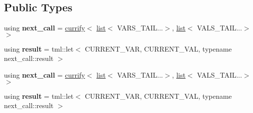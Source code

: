 \subsection*{Public Types}
\begin{DoxyCompactItemize}
\item 
\hypertarget{structtml_1_1impl_1_1multi__let__currifier_1_1currify_3_01list_3_01CURRENT__VAR_00_01VARS__TAIL_0ea6fde6f25a35f6c4f514840e32dfa6_a5dacf4be2ea2cea7e88ece32e5e13adc}{using {\bfseries next\+\_\+call} = \hyperlink{structtml_1_1impl_1_1multi__let__currifier_1_1currify}{currify}$<$ \hyperlink{structtml_1_1list}{list}$<$ V\+A\+R\+S\+\_\+\+T\+A\+I\+L...$>$, \hyperlink{structtml_1_1list}{list}$<$ V\+A\+L\+S\+\_\+\+T\+A\+I\+L...$>$$>$}\label{structtml_1_1impl_1_1multi__let__currifier_1_1currify_3_01list_3_01CURRENT__VAR_00_01VARS__TAIL_0ea6fde6f25a35f6c4f514840e32dfa6_a5dacf4be2ea2cea7e88ece32e5e13adc}

\item 
\hypertarget{structtml_1_1impl_1_1multi__let__currifier_1_1currify_3_01list_3_01CURRENT__VAR_00_01VARS__TAIL_0ea6fde6f25a35f6c4f514840e32dfa6_a1f1d26665731e0bab4ca7c8a6db8870f}{using {\bfseries result} = tml\+::let$<$ C\+U\+R\+R\+E\+N\+T\+\_\+\+V\+A\+R, C\+U\+R\+R\+E\+N\+T\+\_\+\+V\+A\+L, typename next\+\_\+call\+::result $>$}\label{structtml_1_1impl_1_1multi__let__currifier_1_1currify_3_01list_3_01CURRENT__VAR_00_01VARS__TAIL_0ea6fde6f25a35f6c4f514840e32dfa6_a1f1d26665731e0bab4ca7c8a6db8870f}

\item 
\hypertarget{structtml_1_1impl_1_1multi__let__currifier_1_1currify_3_01list_3_01CURRENT__VAR_00_01VARS__TAIL_0ea6fde6f25a35f6c4f514840e32dfa6_a5dacf4be2ea2cea7e88ece32e5e13adc}{using {\bfseries next\+\_\+call} = \hyperlink{structtml_1_1impl_1_1multi__let__currifier_1_1currify}{currify}$<$ \hyperlink{structtml_1_1list}{list}$<$ V\+A\+R\+S\+\_\+\+T\+A\+I\+L...$>$, \hyperlink{structtml_1_1list}{list}$<$ V\+A\+L\+S\+\_\+\+T\+A\+I\+L...$>$$>$}\label{structtml_1_1impl_1_1multi__let__currifier_1_1currify_3_01list_3_01CURRENT__VAR_00_01VARS__TAIL_0ea6fde6f25a35f6c4f514840e32dfa6_a5dacf4be2ea2cea7e88ece32e5e13adc}

\item 
\hypertarget{structtml_1_1impl_1_1multi__let__currifier_1_1currify_3_01list_3_01CURRENT__VAR_00_01VARS__TAIL_0ea6fde6f25a35f6c4f514840e32dfa6_a1f1d26665731e0bab4ca7c8a6db8870f}{using {\bfseries result} = tml\+::let$<$ C\+U\+R\+R\+E\+N\+T\+\_\+\+V\+A\+R, C\+U\+R\+R\+E\+N\+T\+\_\+\+V\+A\+L, typename next\+\_\+call\+::result $>$}\label{structtml_1_1impl_1_1multi__let__currifier_1_1currify_3_01list_3_01CURRENT__VAR_00_01VARS__TAIL_0ea6fde6f25a35f6c4f514840e32dfa6_a1f1d26665731e0bab4ca7c8a6db8870f}


\end{DoxyCompactItemize}
